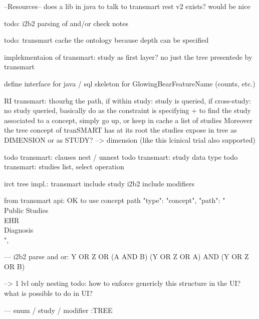 --Resources--
does a lib in java to talk to transmart rest v2 exists? would be nice

todo: i2b2 parsing of and/or check notes

todo: transmart cache the ontology because depth can be specified

implekmentaion of transmart: study as first layer? no just the tree presentede by transmart

define interface for java / sql skeleton for GlowingBearFeatureName (counts, etc.)


RI transmart: thourhg the path, if within study: study is queried, if cross-study: no study queried, basically do as the constraint is specifying
+ to find the study associated to a concept, simply go up, or keep in cache a list of studies
Moreover the tree concept of tranSMART has at its root the studies
expose in tree as DIMENSION or as STUDY? --> dimension (like this lcinical trial also supported)

todo transmart: clauses nest / unnest
todo transmart: study data type
todo transmart: studies list, select operation




irct tree impl.: transmart include study
i2b2 include modifiers


from transmart api: OK to use concept path
 "type": "concept",
                "path": "\\Public Studies\\EHR\\Diagnosis\\",


---
i2b2 parse and or:
Y OR Z OR (A AND B)
(Y OR Z OR A) AND (Y OR Z OR B)

--> 1 lvl only nesting
todo: how to enforce genericly this structure in the UI? what is possible to do in UI?

---
enum / study / modifier :TREE